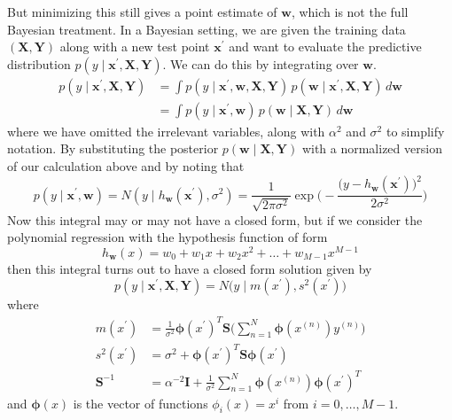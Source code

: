     But minimizing this still gives a point estimate of $\mathbf{w}$, which is not the full Bayesian treatment. In a Bayesian setting, we are given the training data $(\mathbf{X}, \mathbf{Y})$ along with a new test point $\mathbf{x}^\prime$ and want to evaluate the predictive distribution $p(y \mid \mathbf{x}^\prime, \mathbf{X}, \mathbf{Y})$. We can do this by integrating over $\mathbf{w}$. 
    \begin{align*}
        p(y \mid \mathbf{x}^\prime, \mathbf{X}, \mathbf{Y}) & = \int p(y \mid \mathbf{x}^\prime, \mathbf{w}, \mathbf{X}, \mathbf{Y}) \, p(\mathbf{w} \mid \mathbf{x}^\prime, \mathbf{X}, \mathbf{Y}) \, d \mathbf{w} \\
        & = \int p(y \mid \mathbf{x}^\prime, \mathbf{w}) \, p(\mathbf{w} \mid \mathbf{X}, \mathbf{Y}) \, d \mathbf{w} 
    \end{align*}
    where we have omitted the irrelevant variables, along with $\alpha^2$ and $\sigma^2$ to simplify notation. By substituting the posterior $p(\mathbf{w} \mid \mathbf{X}, \mathbf{Y})$ with a normalized version of our calculation above and by noting that 
    \begin{equation}
      p(y \mid \mathbf{x}^\prime, \mathbf{w}) = N(y \mid h_\mathbf{w} (\mathbf{x}^\prime), \sigma^2) = \frac{1}{\sqrt{2 \pi \sigma^2}} \exp \bigg( -\frac{\big(y - h_\mathbf{w} (\mathbf{x}^\prime)\big)^2}{2 \sigma^2} \bigg)
    \end{equation}
    Now this integral may or may not have a closed form, but if we consider the polynomial regression with the hypothesis function of form 
    \begin{equation}
      h_\mathbf{w} (x) = w_0 + w_1 x + w_2 x^2 + \ldots + w_{M-1} x^{M-1}
    \end{equation}
    then this integral turns out to have a closed form solution given by 
    \begin{equation}
      p(y \mid \mathbf{x}^\prime, \mathbf{X}, \mathbf{Y}) = N \big( y \mid m(x^\prime), s^2 (x^\prime)\big)
    \end{equation}
    where 
    \begin{align*}
        m(x^\prime) & = \frac{1}{\sigma^2} \boldsymbol{\phi}(x^\prime)^T \mathbf{S} \bigg( \sum_{n=1}^N \boldsymbol{\phi}(x^{(n)}) y^{(n)} \bigg) \\
        s^2 (x^\prime) & = \sigma^2 + \boldsymbol{\phi}(x^\prime)^T \mathbf{S} \boldsymbol{\phi}(x^\prime) \\
        \mathbf{S}^{-1} & = \alpha^{-2} \mathbf{I} + \frac{1}{\sigma^2} \sum_{n=1}^N \boldsymbol{\phi}(x^{(n)}) \boldsymbol{\phi}(x^\prime)^T 
    \end{align*}
    and $\boldsymbol{\phi}(x)$ is the vector of functions $\phi_i (x) = x^i$ from $i = 0, \ldots, M-1$. 

